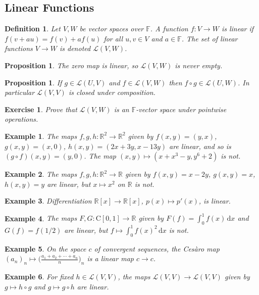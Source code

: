 \documentclass[12pt]{article}
\theoremstyle{breakplain}
\newtheorem{prop}[theorem]{Proposition}
\theoremstyle{breakdef}
\newtheorem{definition}[theorem]{Definition}
\newtheorem*{example}{Example}
\newtheorem{ex}[subsubsection]{Exercise}
\theoremstyle{remark}
\begin{document}
\newpage
\subsection{Linear Functions}
\begin{definition}
     Let $V,W$ be vector spaces over $\mathbb{F}$. A function $f:V\to W$ is \emph{linear} if $f(v+au)=f(v)+af(u)$ for all $u,v \in V$ and $a\in \mathbb{F}$. The set of linear functions $V\to W$ is denoted $\mathcal{L}(V,W)$.
\end{definition}
\begin{prop}
    The zero map is linear, so $\mathcal{L}(V,W)$ is never empty.
\end{prop}
\begin{prop}
    If $g\in\mathcal{L}(U,V)$ and $f\in\mathcal{L}(V,W)$ then $f\circ g\in\mathcal{L}(U,W)$. In particular $\mathcal{L}(V,V)$ is closed under composition.
\end{prop}
\begin{ex}
    Prove that $\mathcal{L}(V,W)$ is an $\mathbb{F}$-vector space under pointwise operations.
\end{ex}
\begin{example}
    The maps $f,g,h:\mathbb{R}^2\to \mathbb{R}^2$ given by $f(x,y)=(y,x)$, $g(x,y)=(x,0)$, $h(x,y)=(2x+3y,x-13y)$ are linear, and so is $(g\circ f)(x,y)=(y,0)$. The map $(x,y)\mapsto (x+x^3-y,y^6+2)$ is not.
\end{example}
\begin{example}
    The maps $f,g,h:\mathbb{R}^2\to \mathbb{R}$ given by $f(x,y)=x-2y$, $g(x,y)=x$, $h(x,y)=y$ are linear, but $x\mapsto x^2$ on $\mathbb{R}$ is not.
\end{example}
\begin{example}
    Differentiation $\mathbb{R}[x]\to \mathbb{R}[x]$, $p(x) \mapsto p'(x)$, is linear.
\end{example}
\begin{example}
    The maps $F,G:\mathrm{C}[0,1]\to \mathbb{R}$ given by $F(f)=\int_0^1 f(x)\, \mathrm{d}x$ and $G(f)=f(1/2)$ are linear, but $f\mapsto \int_0^1 f(x)^2\, \mathrm{d}x$ is not.
\end{example}
\begin{example}
    On the space $c$ of convergent sequences, the Ces\`aro map $(a_n)_n \mapsto \big(\frac{a_1+a_2+\cdots+a_n}{n}\big)_n$ is a linear map $c\to c$.
\end{example}
\begin{example}
    For fixed $h \in \mathcal{L}(V,V)$, the maps $\mathcal{L}(V,V)\to \mathcal{L}(V,V)$ given by $g\mapsto h\circ g$ and $g\mapsto g\circ h$ are linear.
\end{example}
\end{document}

